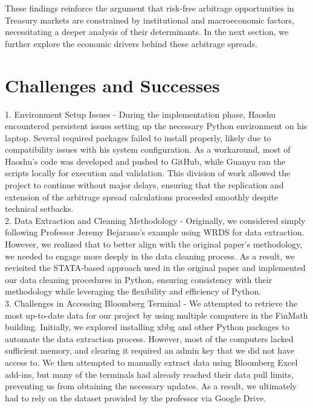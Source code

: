 \documentclass{article}
\begin{document}
These findings reinforce the argument that risk-free arbitrage opportunities in Treasury markets are constrained by institutional and macroeconomic factors, necessitating a deeper analysis of their determinants. In the next section, we further explore the economic drivers behind these arbitrage spreads.




\section{Challenges and Successes}


1. Environment Setup Issues - During the implementation phase, Haoshu encountered persistent issues setting up the necessary Python environment on his laptop. Several required packages failed to install properly, likely due to compatibility issues with his system configuration. As a workaround, most of Haoshu’s code was developed and pushed to GitHub, while Guanyu ran the scripts locally for execution and validation. This division of work allowed the project to continue without major delays, ensuring that the replication and extension of the arbitrage spread calculations proceeded smoothly despite technical setbacks. \\


2. Data Extraction and Cleaning Methodology - Originally, we considered simply following Professor Jeremy Bejarano’s example using WRDS for data extraction. However, we realized that to better align with the original paper’s methodology, we needed to engage more deeply in the data cleaning process. As a result, we revisited the STATA-based approach used in the original paper and implemented our data cleaning procedures in Python, ensuring consistency with their methodology while leveraging the flexibility and efficiency of Python. \\

3. Challenges in Accessing Bloomberg Terminal - We attempted to retrieve the most up-to-date data for our project by using multiple computers in the FinMath building. Initially, we explored installing xbbg and other Python packages to automate the data extraction process. However, most of the computers lacked sufficient memory, and clearing it required an admin key that we did not have access to. We then attempted to manually extract data using Bloomberg Excel add-ins, but many of the terminals had already reached their data pull limits, preventing us from obtaining the necessary updates. As a result, we ultimately had to rely on the dataset provided by the professor via Google Drive.
\end{document}
